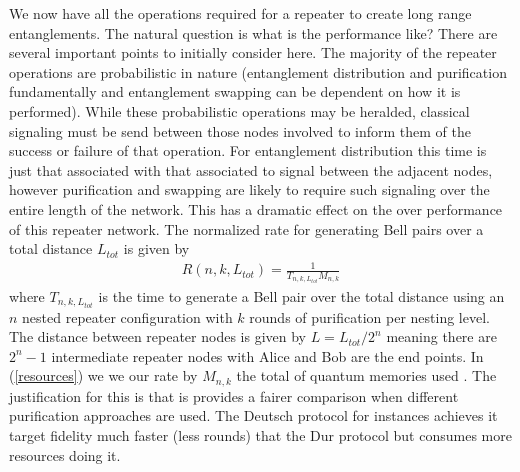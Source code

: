 \documentclass[twocolumn, aps, rmp, amsmath, amssymb, nofootinbib, superscriptaddress, longbibliography, floatfix, table-of-contents, eqsecnum]{revtex4-1}
\begin{document}
We now have all the operations required for a repeater to create long range entanglements. The natural question is what is the performance like? There are several important points to initially consider here. The majority of the repeater operations are probabilistic in nature (entanglement distribution and purification fundamentally and entanglement swapping can be dependent on how it is performed). While these probabilistic operations may be heralded, classical signaling must  be send between those nodes involved to inform them of the success or failure of that operation. For entanglement distribution this time is just that associated with that associated to signal between the adjacent nodes, however purification and swapping are likely to require such signaling over the entire length of the network. This has a dramatic effect on the over performance of this repeater network. The normalized rate for generating Bell pairs over a total distance $L_{tot}$ is given by
\begin{align}
R(n,k,L_{tot})= \frac{1}{T_{n,k,L_{tot}} M_{n,k}}
\label{resources}
\end{align}
where $T_{n,k,L_{tot}}$ is the time to generate a Bell pair over the total distance using an $n$ nested repeater configuration with $k$ rounds of purification per nesting level. The distance between repeater nodes is given by $L=L_{tot}/2^n$ meaning there are $2^n-1$ intermediate repeater nodes with Alice and Bob are the end points. In (\ref{resources}) we we  our rate by $M_{n,k}$ the total of quantum memories used . The justification for this is that is provides a fairer comparison when different purification approaches are used. The Deutsch protocol for instances achieves it target fidelity much faster (less rounds) that the Dur protocol but consumes more resources doing it. 
\end{document}
